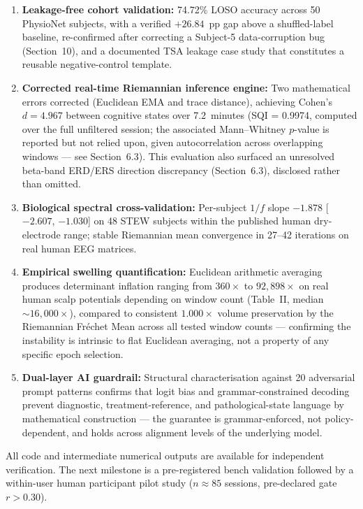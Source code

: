 \documentclass[11pt]{article}
\begin{document}
\begin{enumerate}[leftmargin=*]
\item \textbf{Leakage-free cohort validation:} 74.72\% LOSO accuracy across 50 PhysioNet subjects, with a verified $+26.84$~pp gap above a shuffled-label baseline, re-confirmed after correcting a Subject-5 data-corruption bug (Section~10), and a documented TSA leakage case study that constitutes a reusable negative-control template.
\item \textbf{Corrected real-time Riemannian inference engine:} Two mathematical errors corrected (Euclidean EMA and trace distance), achieving Cohen's $d = 4.967$ between cognitive states over 7.2~minutes (SQI = 0.9974, computed over the full unfiltered session; the associated Mann--Whitney $p$-value is reported but not relied upon, given autocorrelation across overlapping windows --- see Section~6.3). This evaluation also surfaced an unresolved beta-band ERD/ERS direction discrepancy (Section~6.3), disclosed rather than omitted.
\item \textbf{Biological spectral cross-validation:} Per-subject $1/f$ slope $-1.878$ [$-2.607$, $-1.030$] on 48 STEW subjects within the published human dry-electrode range; stable Riemannian mean convergence in 27--42 iterations on real human EEG matrices.
\item \textbf{Empirical swelling quantification:} Euclidean arithmetic averaging produces determinant inflation ranging from $360\times$ to $92{,}898\times$ on real human scalp potentials depending on window count (Table~II, median $\sim16{,}000\times$), compared to consistent $1.000\times$ volume preservation by the Riemannian Fr\'echet Mean across all tested window counts --- confirming the instability is intrinsic to flat Euclidean averaging, not a property of any specific epoch selection.
\item \textbf{Dual-layer AI guardrail:} Structural characterisation against 20 adversarial prompt patterns confirms that logit bias and grammar-constrained decoding prevent diagnostic, treatment-reference, and pathological-state language by mathematical construction --- the guarantee is grammar-enforced, not policy-dependent, and holds across alignment levels of the underlying model.
\end{enumerate}

All code and intermediate numerical outputs are available for independent verification. The next milestone is a pre-registered bench validation followed by a within-user human participant pilot study ($n \approx 85$ sessions, pre-declared gate $r > 0.30$).
\end{document}

